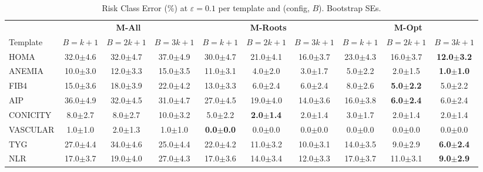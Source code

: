 \providecommand{\pmstd}[1]{{\scriptsize $\pm$#1}}

\begin{table}[t]
\centering
\small
\caption{Risk Class Error (\%) at $\varepsilon=0.1$ per template and (config, $B$). Bootstrap SEs.}
\label{tab:agent_rce_eps0.1}
\begin{tabular}{l|ccc|ccc|ccc}
\toprule
& \multicolumn{3}{c|}{\textbf{M-All}} & \multicolumn{3}{c|}{\textbf{M-Roots}} & \multicolumn{3}{c}{\textbf{M-Opt}} \\
Template & $B=k+1$ & $B=2k+1$ & $B=3k+1$ & $B=k+1$ & $B=2k+1$ & $B=3k+1$ & $B=k+1$ & $B=2k+1$ & $B=3k+1$ \\
\midrule
HOMA & 32.0\pmstd{4.6} & 32.0\pmstd{4.7} & 37.0\pmstd{4.9} & 30.0\pmstd{4.7} & 21.0\pmstd{4.1} & 16.0\pmstd{3.7} & 23.0\pmstd{4.3} & 16.0\pmstd{3.7} & \textbf{12.0\pmstd{3.2}} \\
ANEMIA & 10.0\pmstd{3.0} & 12.0\pmstd{3.3} & 15.0\pmstd{3.5} & 11.0\pmstd{3.1} & 4.0\pmstd{2.0} & 3.0\pmstd{1.7} & 5.0\pmstd{2.2} & 2.0\pmstd{1.5} & \textbf{1.0\pmstd{1.0}} \\
FIB4 & 15.0\pmstd{3.6} & 18.0\pmstd{3.9} & 22.0\pmstd{4.2} & 13.0\pmstd{3.3} & 6.0\pmstd{2.4} & 6.0\pmstd{2.4} & 8.0\pmstd{2.6} & \textbf{5.0\pmstd{2.2}} & 5.0\pmstd{2.2} \\
AIP & 36.0\pmstd{4.9} & 32.0\pmstd{4.5} & 31.0\pmstd{4.7} & 27.0\pmstd{4.5} & 19.0\pmstd{4.0} & 14.0\pmstd{3.6} & 16.0\pmstd{3.8} & \textbf{6.0\pmstd{2.4}} & 6.0\pmstd{2.4} \\
CONICITY & 8.0\pmstd{2.7} & 8.0\pmstd{2.7} & 10.0\pmstd{3.2} & 5.0\pmstd{2.2} & \textbf{2.0\pmstd{1.4}} & 2.0\pmstd{1.4} & 3.0\pmstd{1.7} & 2.0\pmstd{1.4} & 2.0\pmstd{1.4} \\
VASCULAR & 1.0\pmstd{1.0} & 2.0\pmstd{1.3} & 1.0\pmstd{1.0} & \textbf{0.0\pmstd{0.0}} & 0.0\pmstd{0.0} & 0.0\pmstd{0.0} & 0.0\pmstd{0.0} & 0.0\pmstd{0.0} & 0.0\pmstd{0.0} \\
TYG & 27.0\pmstd{4.4} & 34.0\pmstd{4.6} & 25.0\pmstd{4.4} & 22.0\pmstd{4.2} & 11.0\pmstd{3.2} & 10.0\pmstd{3.1} & 14.0\pmstd{3.5} & 9.0\pmstd{2.9} & \textbf{6.0\pmstd{2.4}} \\
NLR & 17.0\pmstd{3.7} & 19.0\pmstd{4.0} & 27.0\pmstd{4.3} & 17.0\pmstd{3.6} & 14.0\pmstd{3.4} & 12.0\pmstd{3.3} & 17.0\pmstd{3.7} & 11.0\pmstd{3.1} & \textbf{9.0\pmstd{2.9}} \\
\bottomrule
\end{tabular}
\end{table}

